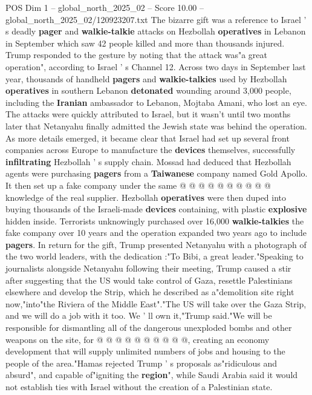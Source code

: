\begin{textsample}{POS Dim 1 – global\_north\_2025\_02 – Score 10.00 – global\_north\_2025\_02/120923207.txt}  \label{ex:f1_pos_446}
The bizarre gift was a reference to Israel ' s deadly \textbf{pager} and \textbf{walkie-talkie} attacks on Hezbollah \textbf{operatives} in Lebanon in September which saw 42 people killed and more than thousands injured.
Trump responded to the gesture by noting that the attack was"a great operation", according to Israel ' s Channel 12.
Across two days in September last year, thousands of handheld \textbf{pagers} and \textbf{walkie-talkies} used by Hezbollah \textbf{operatives} in southern Lebanon \textbf{detonated} wounding around 3,000 people, including the \textbf{Iranian} ambassador to Lebanon, Mojtaba Amani, who lost an eye.
The attacks were quickly attributed to Israel, but it wasn't until two months later that Netanyahu finally admitted the Jewish state was behind the operation.
As more details emerged, it became clear that Israel had set up several front companies across Europe to manufacture the \textbf{devices} themselves, successfully \textbf{infiltrating} Hezbollah ' s supply chain.
Mossad had deduced that Hezbollah agents were purchasing \textbf{pagers} from a \textbf{Taiwanese} company named Gold Apollo.
It then set up a fake company under the same @ @ @ @ @ @ @ @ @ @ knowledge of the real supplier.
Hezbollah \textbf{operatives} were then duped into buying thousands of the Israeli-made \textbf{devices} containing, with plastic \textbf{explosive} hidden inside.
Terrorists unknowingly purchased over 16,000 \textbf{walkie-talkies} the fake company over 10 years and the operation expanded two years ago to include \textbf{pagers}.
In return for the gift, Trump presented Netanyahu with a photograph of the two world leaders, with the dedication :"To Bibi, a great leader."Speaking to journalists alongside Netanyahu following their meeting, Trump caused a stir after suggesting that the US would take control of Gaza, resettle Palestinians elsewhere and develop the Strip, which he described as a"demolition site right now,"into"the Riviera of the Middle East"."The US will take over the Gaza Strip, and we will do a job with it too.
We ' ll own it,"Trump said."We will be responsible for dismantling all of the dangerous unexploded bombs and other weapons on the site, for @ @ @ @ @ @ @ @ @ @, creating an economy development that will supply unlimited numbers of jobs and housing to the people of the area."Hamas rejected Trump ' s proposals as"ridiculous and absurd", and capable of"igniting the \textbf{region}", while Saudi Arabia said it would not establish ties with Israel without the creation of a Palestinian state.

\end{textsample}
